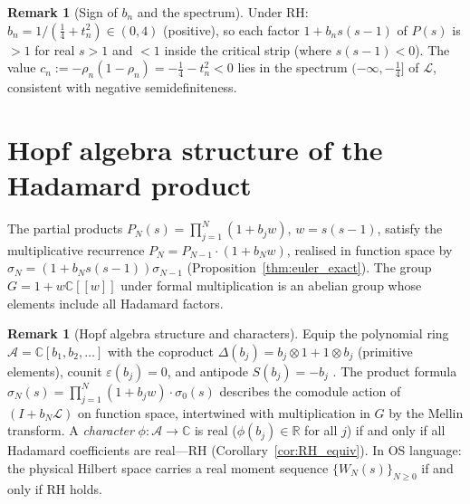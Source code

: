 \documentclass[12pt]{article}
\theoremstyle{plain}
\theoremstyle{definition}
\newtheorem{remark}[theorem]{Remark}
\newcommand{\C}{\mathbb{C}}
\newcommand{\R}{\mathbb{R}}
\begin{document}
\begin{remark}[Sign of $b_n$ and the spectrum]
Under RH: $b_n=1/(\tfrac14+t_n^2)\in(0,4)$ (positive), so each factor
$1+b_n s(s-1)$ of $P(s)$ is $>1$ for real $s>1$ and $<1$ inside the critical
strip (where $s(s-1)<0$).  The value $c_n:=-\rho_n(1-\rho_n)=-\tfrac14-t_n^2<0$
lies in the spectrum $(-\infty,-\tfrac14]$ of $\mathcal{L}$, consistent with
negative semidefiniteness.
\end{remark}

\section{Hopf algebra structure of the Hadamard product}\label{sec:hopf}

The partial products $P_N(s)=\prod_{j=1}^N(1+b_j w)$, $w=s(s-1)$, satisfy
the multiplicative recurrence $P_N=P_{N-1}\cdot(1+b_N w)$, realised in
function space by $\sigma_N=(1+b_N s(s-1))\sigma_{N-1}$
(Proposition~\ref{thm:euler_exact}).  The group $G=1+w\C[[w]]$ under formal
multiplication is an abelian group whose elements include all Hadamard factors.

\begin{remark}[Hopf algebra structure and characters]
Equip the polynomial ring $\mathcal{A}=\C[b_1,b_2,\ldots]$ with the
coproduct $\Delta(b_j)=b_j\otimes1+1\otimes b_j$ (primitive elements),
counit $\varepsilon(b_j)=0$, and antipode $S(b_j)=-b_j$
\cite{Drinfeld1985}.
The product formula $\sigma_N(s)=\prod_{j=1}^N(1+b_j w)\cdot\sigma_0(s)$
describes the comodule action of $(I+b_N\mathcal{L})$ on function space,
intertwined with multiplication in $G$ by the Mellin transform.
A \emph{character} $\phi:\mathcal{A}\to\C$ is real ($\phi(b_j)\in\R$
for all $j$) if and only if all Hadamard coefficients are real---RH
(Corollary~\ref{cor:RH_equiv}).  In OS language: the physical Hilbert space
carries a real moment sequence $\{W_N(s)\}_{N\ge0}$ if and only if RH holds.
\end{remark}
\end{document}
